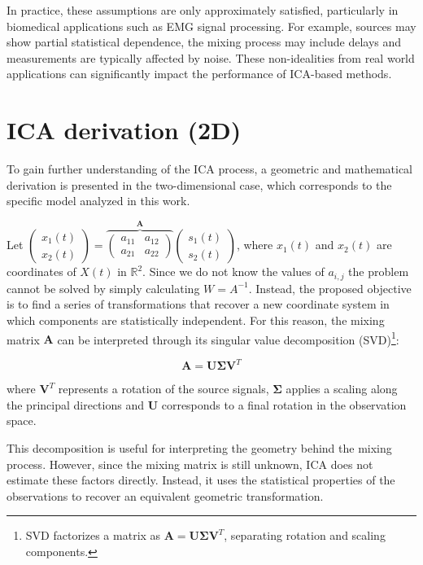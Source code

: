 In practice, these assumptions are only approximately satisfied, particularly in biomedical applications such as EMG signal processing. For example, sources may show partial statistical dependence, the mixing process may include delays and measurements are typically affected by noise. These non-idealities from real world applications can significantly impact the performance of ICA-based methods.

\section{ICA derivation (2D)}
\label{sec:ica_derivation}

To gain further understanding of the ICA process, a geometric and mathematical derivation is presented in the two-dimensional case, which corresponds to the specific model analyzed in this work.

Let $\begin{pmatrix}
x_1(t)  \\
x_2(t)
\end{pmatrix}= 
\overbrace{
\begin{pmatrix}
a_{11} & a_{12} \\
a_{21} & a_{22}
\end{pmatrix}
}^{\mathbf{A}}
\begin{pmatrix}
s_1(t)  \\
s_2(t)
\end{pmatrix}
$, where $x_1(t)$ and $x_2(t)$ are coordinates of $X(t)$ in $\mathbb{R}^2$. Since we do not know the values of $a_{i,j}$ the problem cannot be solved by simply calculating $W=A^{-1}$. Instead, the proposed objective is to find a series of transformations that recover a new coordinate system in which components are statistically independent. For this reason, the mixing matrix $\mathbf{A}$ can be interpreted through its singular value decomposition (SVD)\footnote{SVD factorizes a matrix as $\mathbf{A} = \mathbf{U} \mathbf{\Sigma} \mathbf{V}^T$, separating rotation and scaling components.}:

\begin{equation}
    \mathbf{A} = \mathbf{U} \mathbf{\Sigma} \mathbf{V}^T
\end{equation}

\noindent where $\mathbf{V}^T$ represents a rotation of the source signals, $\mathbf{\Sigma}$ applies a scaling along the principal directions and $\mathbf{U}$ corresponds to a final rotation in the observation space.

This decomposition is useful for interpreting the geometry behind the mixing process. However, since the mixing matrix is still unknown, ICA does not estimate these factors directly. Instead, it uses the statistical properties of the observations to recover an equivalent geometric transformation.

